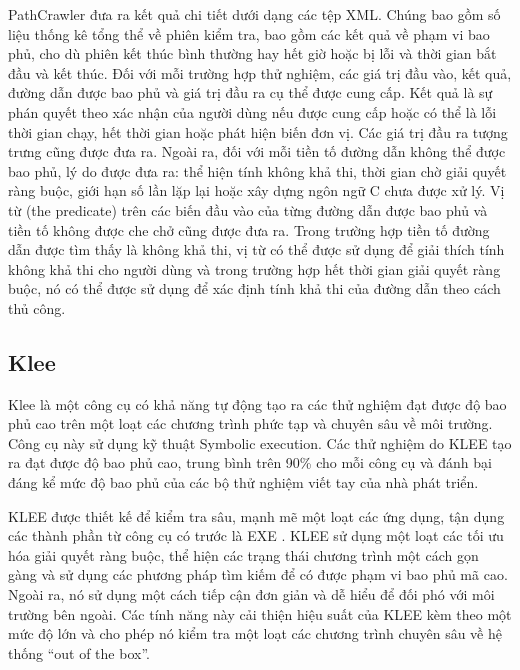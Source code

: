 \documentclass[12pt,a4paper]{article}
\begin{document}
\indent PathCrawler đưa ra kết quả chi tiết dưới dạng các tệp XML. Chúng bao gồm số liệu thống kê tổng thể về phiên kiểm tra, bao gồm các kết quả về phạm vi bao phủ, cho dù phiên kết thúc bình thường hay hết giờ hoặc bị lỗi và thời gian bắt đầu và kết thúc. Đối với mỗi trường hợp thử nghiệm, các giá trị đầu vào, kết quả, đường dẫn được bao phủ và giá trị đầu ra cụ thể được cung cấp. Kết quả là sự phán quyết theo xác nhận của người dùng nếu được cung cấp hoặc có thể là lỗi thời gian chạy, hết thời gian hoặc phát hiện biến đơn vị. Các giá trị đầu ra tượng trưng cũng được đưa ra. Ngoài ra, đối với mỗi tiền tố đường dẫn không thể được bao phủ, lý do được đưa ra: thể hiện tính không khả thi, thời gian chờ giải quyết ràng buộc, giới hạn số lần lặp lại hoặc xây dựng ngôn ngữ C chưa được xử lý. Vị từ (the predicate) trên các biến đầu vào của từng đường dẫn được bao phủ và tiền tố không được che chở cũng được đưa ra. Trong trường hợp tiền tố đường dẫn được tìm thấy là không khả thi, vị từ có thể được sử dụng để giải thích tính không khả thi cho người dùng và trong trường hợp hết thời gian giải quyết ràng buộc, nó có thể được sử dụng để xác định tính khả thi của đường dẫn theo cách thủ công.
\subsection{Klee}
Klee là một công cụ có khả năng tự động tạo ra các thử nghiệm đạt được độ bao phủ cao trên một loạt các chương trình phức tạp và chuyên sâu về môi trường. Công cụ này sử dụng kỹ thuật Symbolic execution. Các thử nghiệm do KLEE tạo ra đạt được độ bao phủ cao, trung bình trên 90\% cho mỗi công cụ và đánh bại đáng kể mức độ bao phủ của các bộ thử nghiệm viết tay của nhà phát triển.

\indent KLEE được thiết kế để kiểm tra sâu, mạnh mẽ một loạt các ứng dụng, tận dụng các thành phần từ công cụ có trước là EXE \cite{cadar2008exe}. KLEE sử dụng một loạt các tối ưu hóa giải quyết ràng buộc, thể hiện các trạng thái chương trình một cách gọn gàng và sử dụng các phương pháp tìm kiếm để có được phạm vi bao phủ mã cao. Ngoài ra, nó sử dụng một cách tiếp cận đơn giản và dễ hiểu để đối phó với môi trường bên ngoài. Các tính năng này cải thiện hiệu suất của KLEE kèm theo một mức độ lớn và cho phép nó kiểm tra một loạt các chương trình chuyên sâu về hệ thống “out of the box”.
\end{document}
